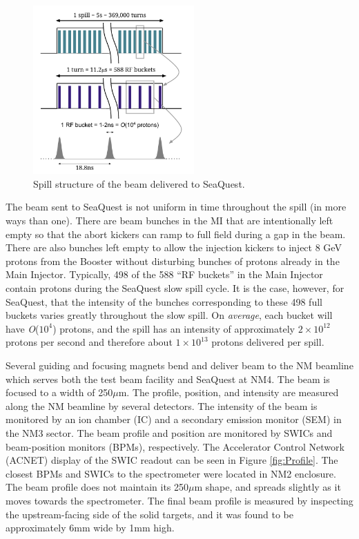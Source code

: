\begin{figure}
	\begin{center}
		\includegraphics[width=0.55\textwidth]{figures/SpillStructure.pdf}
		\caption{Spill structure of the beam delivered to SeaQuest.}
		\label{fig:SpillStructure}
	\end{center}
\end{figure}

The beam sent to SeaQuest is not uniform in time throughout the spill (in more ways than one).  There are beam bunches in the
MI that are intentionally left empty so that the abort kickers can ramp to full field during a gap in the beam. There are also
bunches left empty to allow the injection kickers to inject 8 GeV protons from the Booster without disturbing bunches of protons
already in the Main Injector.  Typically, 498 of the 588 ``RF buckets'' in the Main Injector contain protons during the SeaQuest
slow spill cycle.  It is the case, however, for SeaQuest, that the intensity of the bunches corresponding to these 498 full
buckets varies greatly throughout the slow spill. On \emph{average}, each bucket will have \emph{O}($10^4$) protons, and the spill
has an intensity of approximately $2\times 10^{12}$ protons per second and therefore about $1\times 10^{13}$ protons delivered per spill.

Several guiding and focusing magnets bend and deliver beam to the NM beamline which serves both the test beam facility and SeaQuest at NM4.
The beam is focused to a width of 250$\mu$m. The profile, position, and intensity are measured along the NM beamline by several detectors.
The intensity of the beam is monitored by an ion chamber (IC) and a secondary emission monitor (SEM) in the NM3 sector. The beam profile
and position are monitored by SWICs and beam-position monitors (BPMs), respectively. The Accelerator Control Network
(ACNET) display of the SWIC readout can be seen in Figure \ref{fig:Profile}. The closest BPMs and SWICs to the spectrometer were
located in NM2 enclosure. The beam profile does not maintain its 250$\mu$m shape, and spreads slightly as it moves towards the
spectrometer. The final beam profile is measured by inspecting the upstream-facing side of the solid targets, and it was found
to be approximately 6mm wide by 1mm high.

